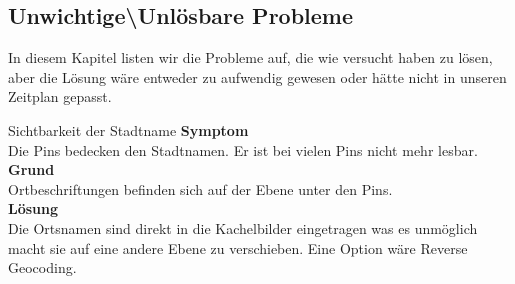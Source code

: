     \subsection{Unwichtige\textbackslash Unlösbare Probleme}

      In diesem Kapitel listen wir die Probleme auf, die wie versucht haben zu lösen, aber die Lösung wäre entweder zu aufwendig gewesen oder hätte nicht in unseren Zeitplan gepasst.

    \begin{Bug}{Sichtbarkeit der Stadtname}
      \textbf{Symptom}\\
      Die Pins bedecken den Stadtnamen. Er ist bei vielen Pins nicht mehr lesbar.\\
      \linebreak
      \textbf{Grund}\\
      Ortbeschriftungen befinden sich auf der Ebene unter den Pins.\\
      \linebreak
      \textbf{Lösung}\\
      Die Ortsnamen sind direkt in die Kachelbilder eingetragen was es unmöglich macht sie 
      auf eine andere Ebene zu verschieben. Eine Option wäre Reverse Geocoding.\\
    \end{Bug}
